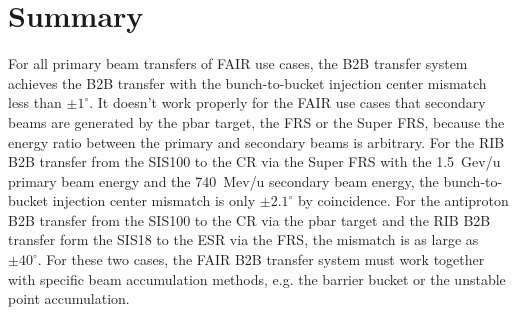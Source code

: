 
\section{Summary}
For all primary beam transfers of FAIR use cases, the B2B transfer system achieves the B2B transfer with the bunch-to-bucket injection center mismatch less than $\pm1^\circ$. It doesn't work properly for the FAIR use cases that secondary beams are generated by the pbar target, the FRS or the Super FRS, because the energy ratio between the primary and secondary beams is arbitrary. For the RIB B2B transfer from the SIS100 to the CR via the Super FRS with the \SI{1.5}{Gev/u} primary beam energy and the \SI{740}{Mev/u} secondary beam energy, the bunch-to-bucket injection center mismatch is only $\pm2.1^\circ$ by coincidence. For the antiproton B2B transfer from the SIS100 to the CR via the pbar target and the RIB B2B transfer form the SIS18 to the ESR via the FRS, the mismatch is as large as $\pm40^\circ$. For these two cases, the FAIR B2B transfer system must work together with specific beam accumulation methods, e.g. the barrier bucket or the unstable point accumulation.


